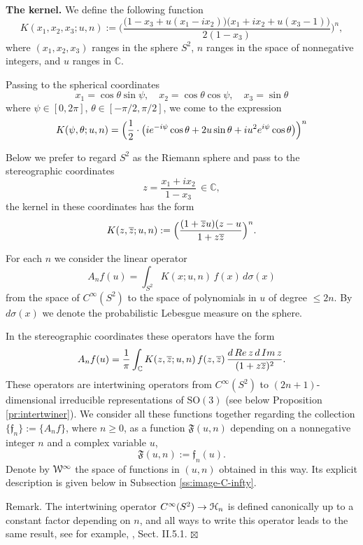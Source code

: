 \documentclass[10pt,a4paper]{amsart}
\newcounter{sec}
\newcounter{punct}[sec]
\def\punct{\refstepcounter{punct}{\arabic{sec}.\arabic{punct}.  }}
\def\SO{\mathrm  {SO}}
\def\le{\leqslant}
\def\ge{\geqslant}
\renewcommand{\Re}{\mathop{\rm Re}\nolimits}
\renewcommand{\Im}{\mathop{\rm Im}\nolimits}
\def\cH{\EuScript H}
\def\cW{\EuScript W}
\def\frF{\mathfrak F}
\def\frf{\mathfrak f}
\def\C {{\mathbb C }}
\def\ov{\overline}
\def\sm{\smallskip}
\begin{document}
\sm

{\bf\punct The kernel.} 
We define the following function 
\begin{equation}
K(x_1,x_2,x_3; u, n):=
\biggl(\frac{\bigl(1-x_3+u(x_1-ix_2)\bigr)
\bigl(x_1+ix_2+u(x_3-1)\bigr)}{2(1-x_3)}\biggr)^n,
\label{eq:K-x}
\end{equation}
where $(x_1,x_2,x_3)$ ranges in the sphere $S^2$,
$n$ ranges in the space of nonnegative integers, and $u$ ranges in $\C$.

Passing to the spherical coordinates 
$$
x_1=\cos\theta\sin\psi,\quad x_2=\cos\theta \cos\psi,
\quad
x_3=\sin\theta
$$
where $\psi\in [0,2\pi]$, $\theta\in [-\pi/2,\pi/2]$,
we come to the expression
\begin{equation}
K(\psi,\theta;u,n)=
\Bigl(\frac 12\cdot \bigl(i e^{-i\psi}\cos\theta
+2u \sin \theta+ i u^2 e^{i\psi}\cos\theta
\bigr)
\Bigr)^n
\label{eq:K-phi}
\end{equation}

Below we prefer to regard $S^2$ as the Riemann sphere
and pass to the stereographic coordinates
$$
z=\frac{x_1+ix_2}{1-x_3}\,\in\C,
$$ 
the kernel in these coordinates has the form
$$
K(z, \ov z; u,n):=\Bigl(\frac{(1+\ov z u)(z-u}{1+z\ov z}\Bigr)^n
.$$

For each $n$ we consider the linear operator
$$
A_n f(u)=\int_{S^2} K(x; u,n) \,f(x)\,d\sigma(x)
$$
from the space of $C^\infty(S^2)$
to the space of polynomials in $u$ of degree
$\le 2n$. By $d\sigma(x)$ we denote the probabilistic
Lebesgue measure on the sphere. 

In the stereographic coordinates these operators have the form
$$
A_n f(u)=\frac 1\pi \int_\C K(z,\ov z;u,n)\, f(z,\ov z)\,\frac{d\Re z\,d\Im z}{(1+z\ov z)^2}.
$$
These operators are intertwining operators from $C^\infty(S^2)$
to $(2n+1)$-dimensional irreducible representations of $\SO(3)$
(see below Proposition \ref{pr:intertwiner}).
We consider all these functions together
regarding the collection $\{\frf_n\}:=\{A_n f\}$, where $n\ge 0$, as a function 
$\frF(u,n)$ depending
on a nonnegative integer $n$ and a complex variable $u$, 
$$
\frF(u,n):=\frf_n(u).
$$
Denote by $\cW^\infty$ the space of functions in $(u,n)$
obtained in this way. Its explicit description is given below
in Subsection \ref{ss:image-C-infty}.



\sm

{\sc Remark.} The intertwining operator $C^\infty(S^2)\to \cH_n$ is defined canonically up to a constant factor depending on $n$, and all ways to write 
this operator leads to the same
result, see for example, \cite{HTF2}, Sect. II.5.1.
\hfill $\boxtimes$
\end{document}
